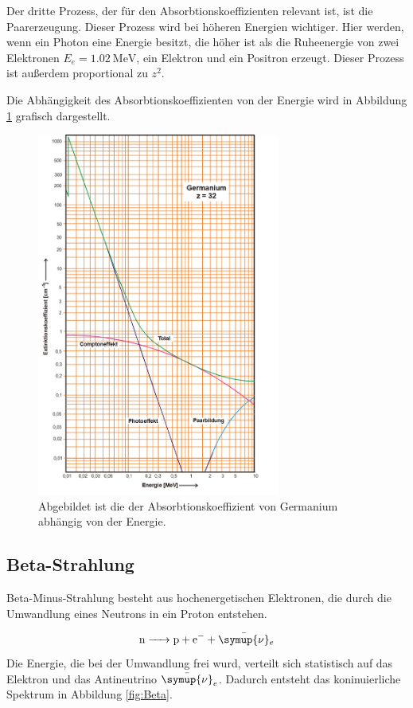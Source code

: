 Der dritte Prozess, der für den Absorbtionskoeffizienten relevant ist, ist die Paarerzeugung.
Dieser Prozess wird bei höheren Energien wichtiger.
Hier werden, wenn ein Photon eine Energie besitzt, die höher ist als die Ruheenergie von zwei Elektronen $E_e=\qty{1.02}{\mega\electronvolt}$, ein Elektron und ein Positron erzeugt.
Dieser Prozess ist außerdem proportional zu $z^2$.

Die Abhängigkeit des Absorbtionskoeffizienten von der Energie wird in Abbildung \ref{fig:Gamma} grafisch dargestellt.
\begin{figure}[H]
    \centering
    \includegraphics[width=8cm]{Bilder/Gamma.png}
    \caption{Abgebildet ist die der Absorbtionskoeffizient von Germanium abhängig von der Energie.}
    \label{fig:Gamma}
\end{figure}


\subsection{Beta-Strahlung}
Beta-Minus-Strahlung besteht aus hochenergetischen Elektronen, die durch die Umwandlung eines Neutrons in ein Proton entstehen.

\begin{equation*}
    \ce{n -> p + e- + \bar{\symup{\nu}}_e}
\end{equation*}
Die Energie, die bei der Umwandlung frei wurd, verteilt sich statistisch auf das Elektron und das Antineutrino $\bar{\symup{\nu}}_e$.
Dadurch entsteht das koninuierliche Spektrum in Abbildung \ref{fig:Beta}.

